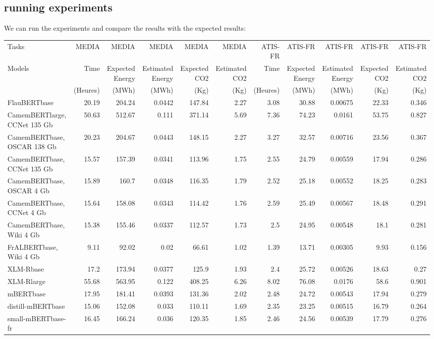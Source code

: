 \documentclass[11pt]{article}
\begin{document}
\subsection{running experiments}
\label{sec:org5d2661e}

We can run the experiments and compare the results with the expected
results: 

\begin{center}
\begin{tabular}{lrrrrrrrrrr}
Tasks & MEDIA & MEDIA & MEDIA & MEDIA & MEDIA & ATIS-FR & ATIS-FR & ATIS-FR & ATIS-FR & ATIS-FR\\
Models & Time & Expected Energy & Estimated Energy & Expected CO2 & Estimated CO2 & Time & Expected Energy & Estimated Energy & Expected CO2 & Estimated CO2\\
 & (Heures) & (MWh) & (MWh) & (Kg) & (Kg) & (Heures) & (MWh) & (MWh) & (Kg) & (Kg)\\
\hline
FlauBERTbase & 20.19 & 204.24 & 0.0442 & 147.84 & 2.27 & 3.08 & 30.88 & 0.00675 & 22.33 & 0.346\\
CamemBERTlarge, CCNet 135 Gb & 50.63 & 512.67 & 0.111 & 371.14 & 5.69 & 7.36 & 74.23 & 0.0161 & 53.75 & 0.827\\
CamemBERTbase, OSCAR 138 Gb & 20.23 & 204.67 & 0.0443 & 148.15 & 2.27 & 3.27 & 32.57 & 0.00716 & 23.56 & 0.367\\
CamemBERTbase, CCNet 135 Gb & 15.57 & 157.39 & 0.0341 & 113.96 & 1.75 & 2.55 & 24.79 & 0.00559 & 17.94 & 0.286\\
CamemBERTbase, OSCAR 4 Gb & 15.89 & 160.7 & 0.0348 & 116.35 & 1.79 & 2.52 & 25.18 & 0.00552 & 18.25 & 0.283\\
CamemBERTbase, CCNet 4 Gb & 15.64 & 158.08 & 0.0343 & 114.42 & 1.76 & 2.59 & 25.49 & 0.00567 & 18.48 & 0.291\\
CamemBERTbase, Wiki 4 Gb & 15.38 & 155.46 & 0.0337 & 112.57 & 1.73 & 2.5 & 24.95 & 0.00548 & 18.1 & 0.281\\
FrALBERTbase, Wiki 4 Gb & 9.11 & 92.02 & 0.02 & 66.61 & 1.02 & 1.39 & 13.71 & 0.00305 & 9.93 & 0.156\\
XLM-Rbase & 17.2 & 173.94 & 0.0377 & 125.9 & 1.93 & 2.4 & 25.72 & 0.00526 & 18.63 & 0.27\\
XLM-Rlarge & 55.68 & 563.95 & 0.122 & 408.25 & 6.26 & 8.02 & 76.08 & 0.0176 & 58.6 & 0.901\\
mBERTbase & 17.95 & 181.41 & 0.0393 & 131.36 & 2.02 & 2.48 & 24.72 & 0.00543 & 17.94 & 0.279\\
distill-mBERTbase & 15.06 & 152.08 & 0.033 & 110.11 & 1.69 & 2.35 & 23.25 & 0.00515 & 16.79 & 0.264\\
small-mBERTbase-fr & 16.45 & 166.24 & 0.036 & 120.35 & 1.85 & 2.46 & 24.56 & 0.00539 & 17.79 & 0.276\\
\end{tabular}
\end{center}
\end{document}
